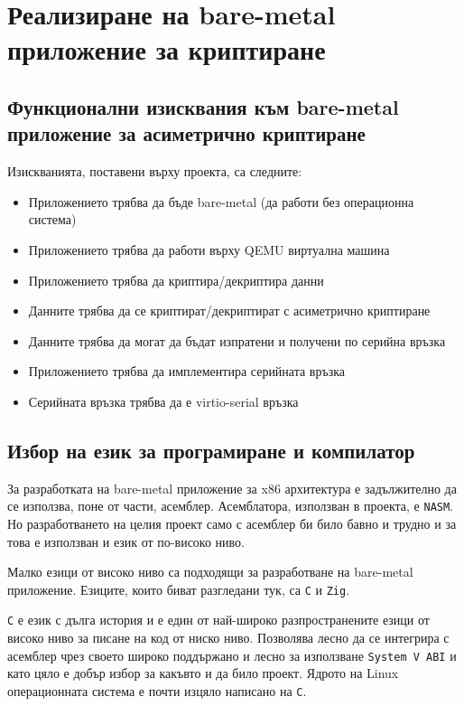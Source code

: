 \chapter{Реализиране на bare-metal приложение за криптиране}
\section{Функционални изисквания към bare-metal приложение за асиметрично криптиране}
Изискванията, поставени върху проекта, са следните:
\begin{itemize}
  \item Приложението трябва да бъде bare-metal (да работи без операционна система)
  \item Приложението трябва да работи върху QEMU виртуална машина
  \item Приложението трябва да криптира/декриптира данни
  \item Данните трябва да се криптират/декриптират с асиметрично криптиране
  \item Данните трябва да могат да бъдат изпратени и получени по серийна връзка
  \item Приложението трябва да имплементира серийната връзка
  \item Серийната връзка трябва да е virtio-serial връзка
\end{itemize}

\section{Избор на език за програмиране и компилатор}
За разработката на bare-metal приложение за x86 архитектура е задължително да се използва, поне от части, асемблер. Асемблатора, използван в проекта, е {\tt NASM}. Но разработването на целия проект само с асемблер би било бавно и трудно и за това е използван и език от по-високо ниво.

Малко езици от високо ниво са подходящи за разработване на bare-metal приложение. Езиците, които биват разгледани тук, са {\tt C} и {\tt Zig}.

{\tt C} е език с дълга история и е един от най-широко разпространените езици от високо ниво за писане на код от ниско ниво. Позволява лесно да се интегрира с асемблер чрез своето широко поддържано и лесно за използване {\tt System V ABI}\cite{sysvabi} и като цяло е добър избор за какъвто и да било проект. Ядрото на Linux операционната система е почти изцяло написано на {\tt C}.\cite{linux-source}

